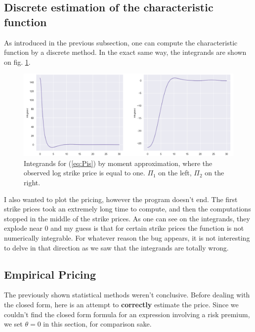 \subsection{Discrete estimation of the characteristic function}

As introduced in the previous subsection, one can compute the characteristic function by a discrete method. In the exact same way, the integrands are shown on fig. \ref{fig:integrand_moments}.

\begin{figure}
\centering
\includegraphics[width = 0.8 \textwidth]{../addition_part/images/integration_fft/moments_integrands.png}
\caption{Integrands for (\ref{eq:Pis}) by moment approximation, where the observed log strike price is equal to one. $\Pi_1$ on the left, $\Pi_2$ on the right.}
\label{fig:integrand_moments}
\end{figure}


I also wanted to plot the pricing, however the program doesn't end. The first strike prices took an extremely long time to compute, and then the computations stopped in the middle of the strike prices. As one can see on the integrands, they explode near $0$ and my guess is that for certain strike prices the function is not numerically integrable. For whatever reason the bug appears, it is not interesting to delve in that direction as we saw that the integrands are totally wrong. 














\subsection{Empirical Pricing}
\label{empirical_price}
The previously shown statistical methods weren't conclusive. Before dealing with the closed form, here is an attempt to \textbf{correctly} estimate the price. Since we couldn't find the closed form formula for an expression involving a risk premium, we set $\theta = 0$ in this section, for comparison sake.


